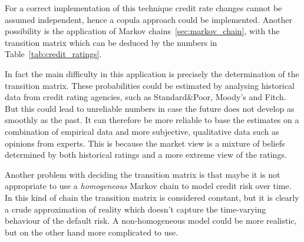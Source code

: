For a correct implementation of this technique credit rate changes cannot be assumed independent, hence a copula approach could be implemented.
Another possibility is the application of Markov chains~\ref{sec:markov_chain}, with the transition matrix which can be deduced by the numbers in Table~\ref{tab:credit_ratings}.

In fact the main difficulty in this application is precisely the determination of the transition matrix. These probabilities could be estimated by analysing historical data from credit rating agencies, such as Standard\&Poor, Moody’s and Fitch. But this could lead to unreliable numbers in case the future does not develop as smoothly as the past. It can therefore be more reliable to base the estimates on a combination of empirical data and more subjective, qualitative data such as opinions from experts. This is because the market view is a mixture of beliefs determined by both historical ratings and a more extreme view of the ratings. 

Another problem with deciding the transition matrix is that maybe it is not appropriate to use a \emph{homogeneous} Markov chain to model credit risk over time. In this kind of chain the transition matrix is considered constant, but it is clearly a crude approximation of reality which doesn't capture the time-varying behaviour of the default risk. A non-homogeneous model could be more realistic, but on the other hand more complicated to use. 

